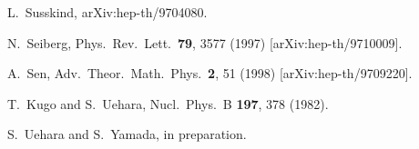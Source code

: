 \documentclass[a4paper,12pt]{article}
\begin{document}
\begin{thebibliography}{99}
L.~Susskind,
	arXiv:hep-th/9704080.

 N.~Seiberg,
	Phys.\ Rev.\ Lett.\  {\bf 79}, 3577 (1997)
	[arXiv:hep-th/9710009].

 A.~Sen,
	Adv.\ Theor.\ Math.\ Phys.\  {\bf 2}, 51 (1998)
	[arXiv:hep-th/9709220].

 T.~Kugo and S.~Uehara,
	Nucl.\ Phys.\ B {\bf 197}, 378 (1982).

S.~Uehara and S.~Yamada, in preparation.

\end{thebibliography}
\end{document}

